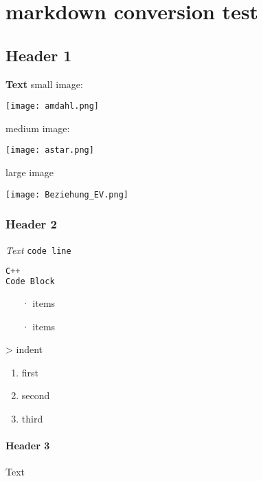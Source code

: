 \section{markdown conversion test}

\subsection{Header 1}
\textbf{Text}
small image:

\begin{center}
 \texttt{[image: amdahl.png]}
\end{center}
medium image:

\begin{center}
 \texttt{[image: astar.png]}
\end{center}
large image

\begin{center}
 \texttt{[image: Beziehung\_EV.png]}
\end{center}

\subsubsection{Header 2}
\textit{Text}
\texttt{code line}

\lstset{style=bright}\begin{lstlisting}[basicstyle=\footnotesize, language=C++]
C++
Code Block
\end{lstlisting}

\begin{itemize}[leftmargin=8pt]
 \item[·] items
 \item[·] items
\end{itemize}

> indent


\begin{enumerate}[leftmargin=12pt]
 \item first
 \item second
 \item third
\end{enumerate}

\paragraph{Header 3}
Text

